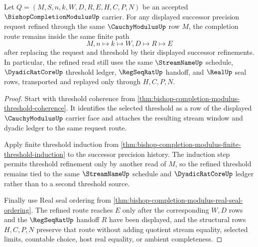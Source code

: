 \begin{theorem}
\label{thm:bishop-completion-modulus-threshold-heredity}
Let $Q=(M,S,n,k,W,D,R,E,H,C,P,N)$ be an accepted $\BishopCompletionModulusUp$ carrier. For any displayed successor precision request refined through the same $\CauchyModulusUp$ row $M$, the completion route remains inside the same finite path
$$
M,n \longmapsto k \longmapsto W,D \longmapsto R \longmapsto E
$$
after replacing the request and threshold by their displayed successor refinements. In particular, the refined read still uses the same $\StreamNameUp$ schedule, $\DyadicRatCoreUp$ threshold ledger, $\RegSeqRatUp$ handoff, and $\RealUp$ seal rows, transported and replayed only through $H,C,P,N$.
\end{theorem}
\begin{proof}
Start with threshold coherence from \autoref{thm:bishop-completion-modulus-threshold-coherence}. It identifies the selected threshold as a row of the displayed $\CauchyModulusUp$ carrier face and attaches the resulting stream window and dyadic ledger to the same request route.

Apply finite threshold induction from \autoref{thm:bishop-completion-modulus-finite-threshold-induction} to the successor precision history. The induction step permits threshold refinement only by another read of $M$, so the refined threshold remains tied to the same $\StreamNameUp$ schedule and $\DyadicRatCoreUp$ ledger rather than to a second threshold source.

Finally use Real seal ordering from \autoref{thm:bishop-completion-modulus-real-seal-ordering}. The refined route reaches $E$ only after the corresponding $W,D$ rows and the $\RegSeqRatUp$ handoff $R$ have been displayed, and the structural rows $H,C,P,N$ preserve that route without adding quotient stream equality, selected limits, countable choice, host real equality, or ambient completeness.
\end{proof}

